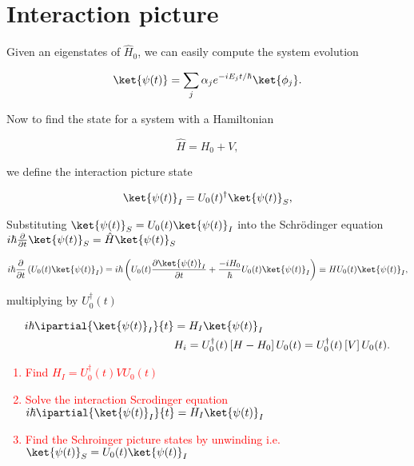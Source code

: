 \section{Interaction picture \label{sec:interaction}}
Given an  eigenstates of $\hat{H}_0$,  we can easily compute  the system
evolution

\begin{equation}
  \ket{\psi(t)} = \sum_j\alpha_je^{-iE_jt/\hbar}\ket{\phi_j}.
\end{equation}

Now to find the state for a system with a Hamiltonian

\begin{equation}
  \hat{H} = {H}_0 +V,
\end{equation}

\noindent we define the interaction picture state

\begin{equation}
  \ket{\psi(t)}_I = U_0(t)^\dagger\ket{\psi(t)}_S,
\end{equation}

\noindent  Substituting  $\ket{\psi(t)}_S  = U_0(t)\ket{\psi(t)}_I$  into  the
Schrödinger                                                     equation
$i\hbar\frac{\partial}{\partial t}\ket{\psi(t)}_S = \hat{H}\ket{\psi(t)}_S$

\begin{equation}
  \begin{aligned}
    i\hbar\frac{\partial}{\partial         t}\left(U_0(t)\ket{\psi(t)}_I\right)         =
    i\hbar\left(U_0(t)\frac{\partial\ket{\psi(t)}_I}{\partial         t}         +
      \frac{-iH_0}{\hbar}U_0(t)\ket{\psi(t)}_I\right) \equiv HU_0(t)\ket{\psi(t)}_I,
  \end{aligned}
\end{equation}

\noindent multiplying by $U_0^\dagger(t)$

\begin{equation}\label{eqn:interactionPictureHamiltonian}
  \begin{aligned}
    i\hbar\ipartial{\ket{\psi(t)}_I}{t} & = H_I\ket{\psi(t)}_I\\
    &      H_i      =      U_0^\dagger(t)\left[H-H_0\right]U_0(t)      =
    U_0^\dagger(t)\left[V\right]U_0(t).
  \end{aligned}
\end{equation}

 \textcolor{red}{\begin{enumerate}
  \item Find $H_I = U_0^\dagger(t)VU_0(t)$
  \item      Solve     the      interaction     Scrodinger      equation
    $i\hbar\ipartial{\ket{\psi(t)}_I}{t} = H_I\ket{\psi(t)}_I$
  \item   Find    the   Schroinger    picture   states    by   unwinding
    i.e. $\ket{\psi(t)}_S = U_0(t)\ket{\psi(t)}_I$
  \end{enumerate}}

